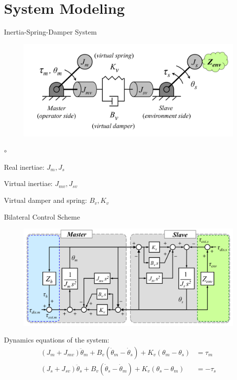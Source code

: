 \documentclass[10pt]{beamer}
\begin{document}
\section{System Modeling}

\begin{frame}{Inertia-Spring-Damper System}
	
	\begin{figure}[h]
	\centering
	\includegraphics[width=0.8\linewidth]{../reportTeleop/Images/spring_damper_inertia_system}
	\end{figure}

	
	\begin{list}{$ \circ $}{}
		\item Real inertiae: $ J_{m}, J_{s} $
		\item Virtual inertiae: $ J_{mv}, J_{sv} $
		\item Virtual damper and spring: $ B_{v}, K_{v} $
	\end{list}

\end{frame}

\begin{frame}{Bilateral Control Scheme}

	\begin{figure}
	\centering
	\includegraphics[width=0.8\linewidth]{../reportTeleop/Images/Block_diagram}
	\end{figure}

Dynamics equations of the system:
\begin{align*}
(J_m + J_{mv})\ddot{\theta}_m + B_v (\dot{\theta}_m - \dot{\theta}_s) + K_v(\theta_m - \theta_s) &= \tau_m \\
(J_s + J_{sv})\ddot{\theta}_s + B_v (\dot{\theta}_s - \dot{\theta}_m) + K_v(\theta_s - \theta_m) &= - \tau_s 
\end{align*}
	
\end{frame}
\end{document}
